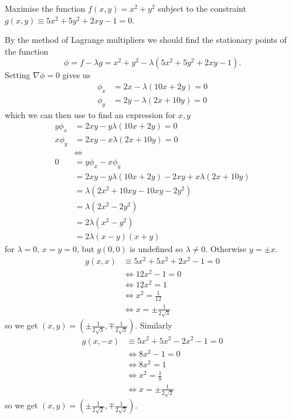 \documentclass[10pt, a4paper]{article}
\begin{document}
\begin{example}
    Maximise the function $f(x, y) = x ^ 2 + y ^ 2$ subject to the constraint $g(x, y) \equiv 5x ^ 2 + 5y ^ 2 + 2xy - 1 = 0$.

    \begin{solution}
        By the method of Lagrange multipliers we should find the stationary points of the function
        \[
        \phi = f - \lambda g = x ^ 2 + y ^ 2  - \lambda(5x ^ 2 + 5y ^ 2 + 2xy - 1).
        \]
        Setting $\nabla \phi = 0$ gives us
        \begin{align*}
            \phi_x &= 2x - \lambda(10x + 2y) = 0 \\
            \phi_y &= 2y - \lambda(2x + 10y) = 0
        \end{align*}
        which we can then use to find an expression for $x, y$
        \begin{align*}
            y\phi_x &= 2xy - y\lambda(10x + 2y) = 0 \\
            x\phi_y &= 2xy - x\lambda(2x + 10y) = 0 \\
            &\iff \\
            0 &= y\phi_x - x\phi_y \\
            &= 2xy - y\lambda(10x + 2y) - 2xy + x\lambda(2x + 10y) \\
            &= \lambda(2x ^ 2 + 10xy - 10xy - 2y ^ 2) \\
            &= \lambda(2x ^ 2 - 2y ^ 2) \\
            &= 2\lambda(x ^ 2 - y ^ 2) \\
            &= 2\lambda(x - y)(x + y)
        \end{align*}
        for $\lambda = 0$,
        $x = y = 0$,
        but $g(0, 0)$ is undefined so $\lambda \neq 0$.
        Otherwise $y = \pm x$.
        \begin{align*}
            g(x, x) &\equiv 5x ^ 2 + 5x ^ 2 + 2x ^ 2 - 1 = 0 \\
            &\iff 12x ^ 2 - 1 = 0 \\
            &\iff 12x ^ 2 = 1 \\
            &\iff x ^ 2 = \frac{1}{12} \\
            &\iff x = \pm\frac{1}{2\sqrt{3}}
        \end{align*}
        so we get $(x, y) = \left(\pm\frac{1}{2\sqrt{3}}, \mp\frac{1}{2\sqrt{3}}\right)$.
        Similarly
        \begin{align*}
            g(x, -x) &\equiv 5x ^ 2 + 5x ^ 2 - 2x ^ 2 - 1 = 0 \\
            &\iff 8x ^ 2 - 1 = 0 \\
            &\iff 8x ^ 2 = 1 \\
            &\iff x ^ 2 = \frac{1}{8} \\
            &\iff x = \pm\frac{1}{2\sqrt{2}}
        \end{align*}
        so we get $(x, y) = \left(\pm\frac{1}{2\sqrt{2}}, \mp\frac{1}{2\sqrt{2}}\right)$.
    \end{solution}
\end{example}
\end{document}
